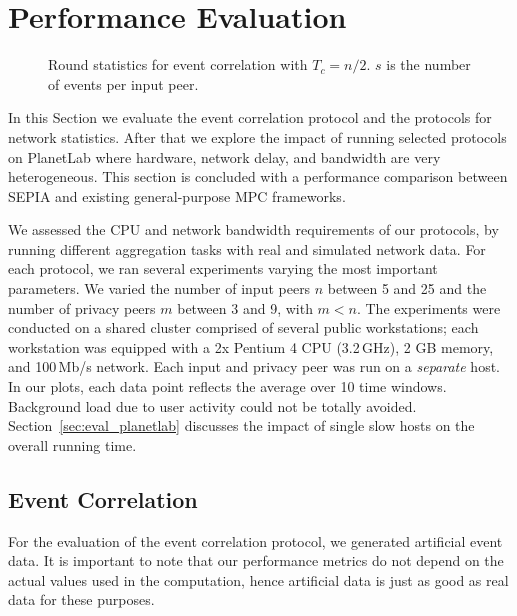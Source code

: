 \documentclass[letterpaper,11pt,onecolumn,titlepage]{article}
\begin{document}
\section{Performance Evaluation}
\label{sec:evaluation}

\begin{figure*}[t]
  \centering
	\caption{Round statistics for event correlation with $T_c=n/2$. $s$ is the number of events per input peer. }
	\label{fig:eventeval}
\end{figure*}


In this Section we evaluate the event correlation protocol and the 
protocols for network statistics. After that we explore the impact of
running selected protocols on PlanetLab where hardware, network delay, and bandwidth are very heterogeneous.
This section is concluded with a performance comparison between SEPIA and existing general-purpose MPC frameworks.

We assessed the CPU and network bandwidth requirements of our
protocols, by running different aggregation tasks with real and simulated network data.
For each protocol, we ran several experiments
varying the most important parameters. We varied the number of input peers $n$ between 5 and 25
and the number of privacy peers $m$ between 3 and 9, with $m < n$. The experiments were conducted
on a shared cluster comprised of several public workstations;
each workstation was equipped with a 2x Pentium 4 CPU (3.2\,GHz),
2 GB memory, and 100\,Mb/s network. Each input and privacy peer was run on a \emph{separate} host.
In our plots, each data point reflects the average over 10 time windows. Background load due to user activity could not be totally avoided. 
Section~\ref{sec:eval_planetlab} discusses  
the impact of single slow hosts on the overall running time.


\subsection{Event Correlation} 
\label{sec:eval_event}

For the evaluation of the event correlation protocol, we generated artificial event data. 
It is important to note that our performance metrics do not depend on the
actual values used in the computation, hence artificial data is just as good as real data for these purposes.
\end{document}
